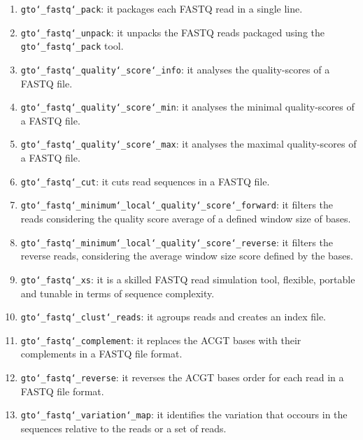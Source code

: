 \begin{enumerate}
\item \texttt{gto\char`_fastq\char`_pack}: it packages each FASTQ read in a single line.

\item \texttt{gto\char`_fastq\char`_unpack}: it unpacks the FASTQ reads packaged using the \texttt{gto\char`_fastq\char`_pack} tool.

\item \texttt{gto\char`_fastq\char`_quality\char`_score\char`_info}: it analyses the quality-scores of a FASTQ file.

\item \texttt{gto\char`_fastq\char`_quality\char`_score\char`_min}: it analyses the minimal quality-scores of a FASTQ file.

\item \texttt{gto\char`_fastq\char`_quality\char`_score\char`_max}: it analyses the maximal quality-scores of a FASTQ file.

\item \texttt{gto\char`_fastq\char`_cut}: it cuts read sequences in a FASTQ file. 

\item \texttt{gto\char`_fastq\char`_minimum\char`_local\char`_quality\char`_score\char`_forward}: it filters the reads considering the quality score average of a defined window size of bases.

\item \texttt{gto\char`_fastq\char`_minimum\char`_local\char`_quality\char`_score\char`_reverse}: it filters the reverse reads, considering the average window size score defined by the bases.

\item \texttt{gto\char`_fastq\char`_xs}: it is a skilled FASTQ read simulation tool, flexible, portable and tunable in terms of sequence complexity.

\item \texttt{gto\char`_fastq\char`_clust\char`_reads}: it agroups reads and creates an index file.

\item \texttt{gto\char`_fastq\char`_complement}: it replaces the ACGT bases with their complements in a FASTQ file format.

\item \texttt{gto\char`_fastq\char`_reverse}: it reverses the ACGT bases order for each read in a FASTQ file format.

\item \texttt{gto\char`_fastq\char`_variation\char`_map}: it identifies the variation that occours in the sequences relative to the reads or a set of reads.


\end{enumerate}
